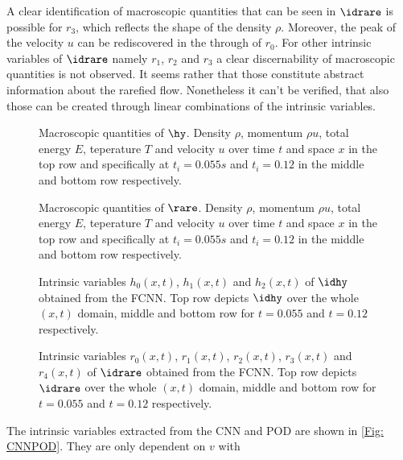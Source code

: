 A clear identification of macroscopic quantities that can be seen in \(\idrare\) is possible for \(r_3\), which reflects the shape of the density \(\rho\). Moreover, the peak of the velocity \(u\) can be rediscovered in the through of \(r_0\). For other intrinsic variables of \(\idrare\) namely \(r_1\), \(r_2\) and \(r_3\) a clear discernability of macroscopic quantities is not observed. It seems rather that those constitute abstract information about the rarefied flow. Nonetheless it can't be verified, that also those can be created through linear combinations of the intrinsic variables.
\clearpage
\begin{figure}[htp!]
	
	\caption{Macroscopic quantities of \(\hy\). Density \(\rho\), momentum \(\rho u\), total energy \(E\), teperature \(T\) and velocity \(u\) over time \(t\) and space \(x\) in the top row and specifically at \(t_i=0.055s\) and \(t_i=0.12\) in the middle and bottom row respectively.}
	\label{Fig: Macro_hy}
\end{figure}
\begin{figure}[hbp!]
	
		\caption{Macroscopic quantities of \(\rare\). Density \(\rho\), momentum \(\rho u\), total energy \(E\), teperature \(T\) and velocity \(u\) over time \(t\) and space \(x\) in the top row and specifically at \(t_i=0.055s\) and \(t_i=0.12\) in the middle and bottom row respectively.}
	\label{Fig: Macro_rare}
\end{figure}
\clearpage
\begin{figure}[htp!]
	\centering
	
	\caption{Intrinsic variables \(h_0(x,t)\), \(h_1(x,t)\) and \(h_2(x,t)\) of \(\idhy\) obtained from the FCNN. Top row depicts \(\idhy\) over the whole \((x,t)\) domain, middle and bottom row for \(t=0.055\) and \(t=0.12\) respectively.}
	\label{Fig: Code_hy}
\end{figure}
\begin{figure}[hbp!]
	
	\caption{Intrinsic variables \(r_0(x,t)\), \(r_1(x,t)\), \(r_2(x,t)\), \(r_3(x,t)\) and \(r_4(x,t)\) of \(\idrare\) obtained from the FCNN. Top row depicts \(\idrare\) over the whole \((x,t)\) domain, middle and bottom row for \(t=0.055\) and \(t=0.12\) respectively.}
	\label{Fig: Code_rare}
\end{figure}
\clearpage
The intrinsic variables extracted from the CNN and POD are shown in \cref{Fig: CNNPOD}. They are only dependent on \(v\) with\\
